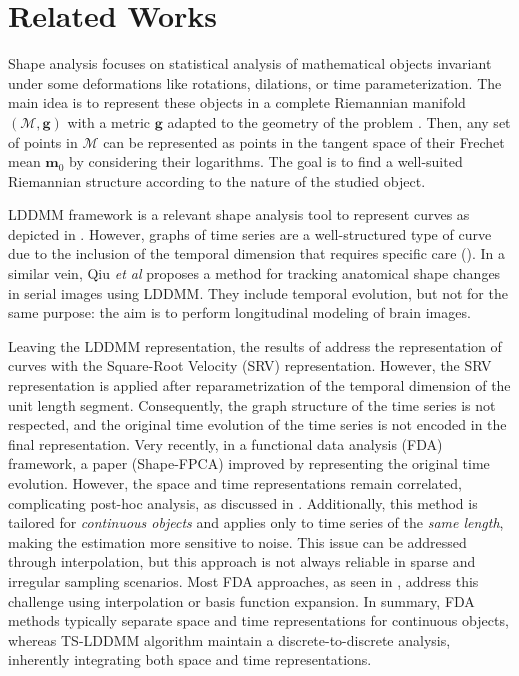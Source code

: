 \section{Related Works}
\vspace{-1ex}

Shape analysis focuses on statistical analysis of mathematical objects invariant under some deformations like rotations, dilations, or time parameterization. The main idea is to represent these objects in a complete Riemannian manifold $(\mathcal{M},\mathbf{g})$ with a metric $\mathbf{g}$ adapted to the geometry of the problem \cite{miller2006geodesic}. Then, any set of points in $\mathcal{M}$ can be represented as points in the tangent space of their Frechet mean $\mathbf{m}_0$ \cite{pal2017riemannian,le2001locating} by considering their logarithms. The goal is to find a well-suited Riemannian structure according to the nature of the studied object.
 
LDDMM framework is a relevant shape analysis tool to represent curves as depicted in \cite{glaunes2008large}. However, graphs of time series are a well-structured type of curve due to the inclusion of the temporal dimension that requires specific care (). In a similar vein, Qiu \textit{et al} \cite{qiu2009time} proposes a method for tracking anatomical shape changes in serial images using LDDMM. They include temporal evolution, but not for the same purpose: the aim is to perform longitudinal modeling of brain images.

Leaving the LDDMM representation, the results of \cite{srivastava2010shape,heo2024logistic} address the representation of curves with the Square-Root Velocity (SRV) representation. However, the SRV representation is applied after reparametrization of the temporal dimension of the unit length segment. Consequently, the graph structure of the time series is not respected, and the original time evolution of the time series is not encoded in the final representation. Very recently, in a functional data analysis (FDA) framework, a paper \cite{wu2024shape} (Shape-FPCA) improved by representing the original time evolution. However, the space and time representations remain correlated, complicating post-hoc analysis, as discussed in  . Additionally, this method is tailored for \textit{continuous objects} and applies only to time series of the \textit{same length}, making the estimation more sensitive to noise. This issue can be addressed through interpolation, but this approach is not always reliable in sparse and irregular sampling scenarios. Most FDA approaches, as seen in \cite{shang2014survey,yu2017principal,warmenhoven2021pca}, address this challenge using interpolation or basis function expansion. In summary, FDA methods typically separate space and time representations for continuous objects, whereas TS-LDDMM algorithm maintain a discrete-to-discrete analysis, inherently integrating both space and time representations.

